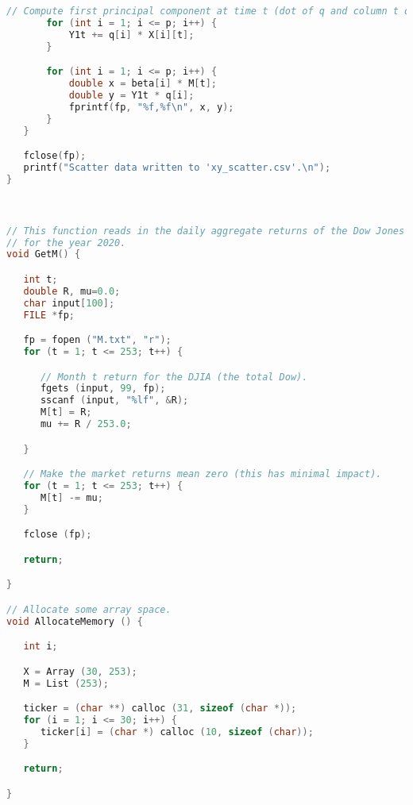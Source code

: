 \documentclass{report}
\begin{document}
\begin{lstlisting}[language=c++]
       // Compute first principal component at time t (dot of q and column t of X)
       for (int i = 1; i <= p; i++) {
           Y1t += q[i] * X[i][t];
       }

       for (int i = 1; i <= p; i++) {
           double x = beta[i] * M[t];
           double y = Y1t * q[i];
           fprintf(fp, "%f,%f\n", x, y);
       }
   }

   fclose(fp);
   printf("Scatter data written to 'xy_scatter.csv'.\n");
}



// This function reads in the daily aggregate returns of the Dow Jones Industrial Average
// for the year 2020.
void GetM() {

   int t;
   double R, mu=0.0;
   char input[100];
   FILE *fp;

   fp = fopen ("M.txt", "r");
   for (t = 1; t <= 253; t++) {

      // Month t return for the DJIA (the total Dow).
      fgets (input, 99, fp);
      sscanf (input, "%lf", &R);
      M[t] = R;
      mu += R / 253.0;

   }

   // Make the market returns mean zero (this has minimal impact).
   for (t = 1; t <= 253; t++) {
      M[t] -= mu;
   }

   fclose (fp);

   return;

}

// Allocate some array space.
void AllocateMemory () {

   int i;

   X = Array (30, 253);
   M = List (253);

   ticker = (char **) calloc (31, sizeof (char *));
   for (i = 1; i <= 30; i++) {
      ticker[i] = (char *) calloc (10, sizeof (char));
   }

   return;

}

\end{lstlisting}
\end{document}
